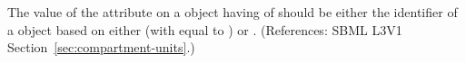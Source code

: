 The value of the attribute  on a \Compartment object having
 of  should be either 
 the identifier of a \UnitDefinition object based on
either  (with  equal to ) or
.  (References: SBML L3V1
Section~\ref{sec:compartment-units}.)
